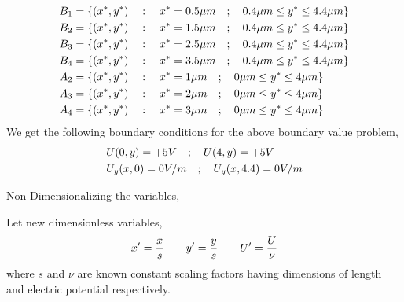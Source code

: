 \begin{align}
    B_1 &= \{ (x^*,y^*) \hspace{0.35cm} : \hspace{0.35cm} x^*= 0.5\mu m \hspace{0.35cm};\hspace{0.35cm} 0.4\mu m \leq y^* \leq 4.4\mu m \} \\
    B_2 &= \{ (x^*,y^*) \hspace{0.35cm} : \hspace{0.35cm} x^*= 1.5\mu m \hspace{0.35cm};\hspace{0.35cm} 0.4\mu m \leq y^* \leq 4.4\mu m \} \\
    B_3 &= \{ (x^*,y^*) \hspace{0.35cm} : \hspace{0.35cm} x^*= 2.5\mu m \hspace{0.35cm};\hspace{0.35cm} 0.4\mu m \leq y^* \leq 4.4\mu m \} \\
    B_4 &= \{ (x^*,y^*) \hspace{0.35cm} : \hspace{0.35cm} x^*= 3.5\mu m \hspace{0.35cm};\hspace{0.35cm} 0.4\mu m \leq y^* \leq 4.4\mu m \} \\
    A_2 &= \{ (x^*,y^*) \hspace{0.35cm} : \hspace{0.35cm} x^*= 1\mu m \hspace{0.35cm};\hspace{0.35cm} 0\mu m \leq y^* \leq 4\mu m \} \\
    A_3 &= \{ (x^*,y^*) \hspace{0.35cm} : \hspace{0.35cm} x^*= 2\mu m \hspace{0.35cm};\hspace{0.35cm} 0\mu m \leq y^* \leq 4\mu m \} \\
    A_4 &= \{ (x^*,y^*) \hspace{0.35cm} : \hspace{0.35cm} x^*= 3\mu m \hspace{0.35cm};\hspace{0.35cm} 0\mu m \leq y^* \leq 4\mu m \} 
\end{align}
We get the following boundary conditions for the above boundary value problem,
\begin{align}
    & U(0,y) = +5 V \hspace{0.35cm}; \hspace{0.35cm} U(4,y) = +5 V \\ 
    & U_y(x,0) = 0V/m \hspace{0.35cm}; \hspace{0.35cm} U_y(x,4.4) = 0V/m 
\end{align}

Non-Dimensionalizing the variables, \autocite{tudortmundkuzmin2}

Let new dimensionless variables,
\begin{align}
    x' = \frac{x}{s} \gs \gs y' = \frac{y}{s} \gs \gs U' = \frac{U}{\nu}
\end{align}
where $s$ and $\nu$ are known constant scaling factors having dimensions of length and electric potential respectively.

